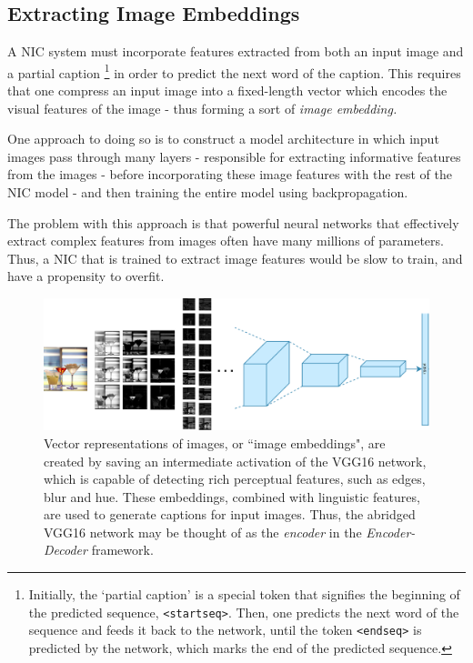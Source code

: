 \documentclass[letterpaper, 10 pt, conference]{ieeeconf}
\begin{document}
\subsection{Extracting Image Embeddings}

A NIC system must incorporate features extracted from both an input image and a partial caption \footnote{Initially, the `partial caption' is a special token that signifies the beginning of the predicted sequence, \texttt{<startseq>}. Then, one predicts the next word of the sequence and feeds it back to the network, until the token \texttt{<endseq>} is predicted by the network, which marks the end of the predicted sequence.} in order to predict the next word of the caption. This requires that one compress an input image into a fixed-length vector which encodes the visual features of the image - thus forming a sort of \emph{image embedding.}

One approach to doing so is to construct a model architecture in which input images pass through many layers - responsible for extracting informative features from the images - before incorporating these image features with the rest of the NIC model - and then training the entire model using backpropagation.  

The problem with this approach is that powerful neural networks that effectively extract complex features from images often have many millions of parameters. Thus, a NIC that is trained to extract image features would be slow to train, and have a propensity to overfit.

\begin{figure}[ht]
\centering
\includegraphics[width=1\linewidth]{cnn_features}
\caption{Vector representations of images, or ``image embeddings", are created by saving an intermediate activation of the VGG16 network, which is capable of detecting rich perceptual features, such as edges, blur and hue. These embeddings, combined with linguistic features, are used to generate captions for input images. Thus, the abridged VGG16 network may be thought of as the \emph{encoder} in the \emph{Encoder-Decoder} framework.}
\label{fig:test1}
\end{figure}
\end{document}
